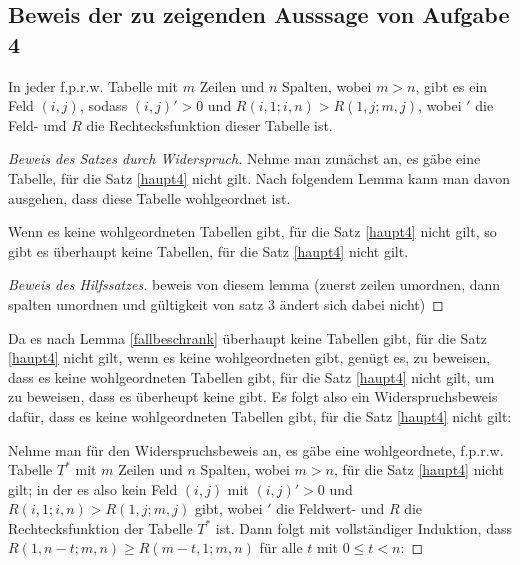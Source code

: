 \subsection*{Beweis der zu zeigenden Ausssage von Aufgabe 4}

\begin{thm}\label{haupt4}
    In jeder f.p.r.w. Tabelle mit $m$ Zeilen und $n$ Spalten, wobei $m>n$, gibt es ein Feld $(i, j)$, sodass 
    $(i, j)'>0$ und $R(i, 1; i, n) > R(1, j; m, j)$, wobei $'$ die Feld- und $R$ die Rechtecksfunktion dieser 
    Tabelle ist.
\end{thm}

\begin{proof}[Beweis des Satzes durch Widerspruch]
    Nehme man zunächst an, es gäbe eine Tabelle, für die Satz \ref{haupt4} nicht gilt. Nach folgendem Lemma kann man 
    davon ausgehen, dass diese Tabelle wohlgeordnet ist.
    \begin{lem}\label{fallbeschrank}
        Wenn es keine wohlgeordneten Tabellen gibt, für die Satz \ref{haupt4} nicht gilt, so gibt es überhaupt keine 
        Tabellen, für die Satz \ref{haupt4} nicht gilt.
    \end{lem}
    \begin{proof}[Beweis des Hilfssatzes]
        beweis von diesem lemma (zuerst zeilen umordnen, dann spalten umordnen und gültigkeit von satz 3 ändert sich 
        dabei nicht) %
    \end{proof}
    Da es nach Lemma \ref{fallbeschrank} überhaupt keine Tabellen gibt, für die Satz \ref{haupt4} 
    nicht gilt, wenn es keine wohlgeordneten gibt, genügt es, zu beweisen, dass es keine wohlgeordneten Tabellen 
    gibt, für die Satz \ref{haupt4} nicht gilt, um zu beweisen, dass es überheupt keine gibt. Es folgt also ein 
    Widerspruchsbeweis dafür, dass es keine wohlgeordneten Tabellen gibt, für die Satz \ref{haupt4} nicht gilt:

    Nehme man für den Widerspruchsbeweis an, es gäbe eine wohlgeordnete, f.p.r.w. Tabelle $T^*$ mit $m$ Zeilen und $n$ 
    Spalten, wobei $m>n$, für die Satz \ref{haupt4} nicht gilt; in der es also kein Feld $(i, j)$ mit $(i, j)'>0$ 
    und $R(i, 1; i, n)>R(1, j; m, j)$ gibt, wobei $'$ die Feldwert- und $R$ die Rechtecksfunktion der Tabelle $T^*$ 
    ist. Dann folgt mit vollständiger Induktion, dass $R(1, n-t; m, n)\geq R(m-t, 1; m, n)$ für alle $t$ mit $0\leq 
    t<n$:


\end{proof}
